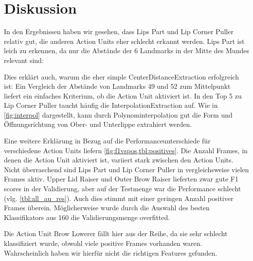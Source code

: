 \chapter{Diskussion}

In den Ergebnissen haben wir gesehen, dass Lips Part und Lip Corner Puller
relativ gut, die anderen Action Units eher schlecht erkannt werden. Lips Part
ist leich zu erkennen, da nur die Abstände der 6 Landmarks in der Mitte des
Mundes relevant sind:


Dies erklärt auch, warum die eher simple CenterDistanceExtraction erfolgreich
ist: Ein Vergleich der Abstände von Landmarks 49 und 52 zum Mittelpunkt liefert
ein einfaches Kriterium, ob die Action Unit aktiviert ist.
In den Top 5 zu Lip Corner Puller taucht häufig die InterpolationExtraction auf.
Wie in \cref{fig:interpol} dargestellt, kann durch Polynominterpolation gut die
Form und Öffnungsrichtung von Ober- und Unterlippe extrahiert werden. 

Eine weitere Erklärung in Bezug auf die Performanceunterschiede für verschiedene
Action Units liefern \cref{fig:f1vspos,tbl:positives}. Die Anzahl Frames, in
denen die Action Unit aktiviert ist, variiert stark zwischen den Action Units.
Nicht überraschend sind Lips Part und Lip Corner Puller in vergleichsweise
vielen Frames aktiv. Upper Lid Raiser und Outer Brow Raiser lieferten
zwar gute F1 scores in der Validierung, aber auf der Testmenge war die
Performance schlecht (vlg. \cref{tbl:all_au_res}). Auch dies stimmt mit einer
geringen Anzahl positiver Frames überein. Möglicherweise wurde durch die Auswahl
des besten Klassifikators aus 160 die Validierungsmenge overfitted.

Die Action Unit Brow Lowerer fällt hier aus der Reihe, da sie sehr schlecht
klassifiziert wurde, obwohl viele positive Frames vorhanden waren.
Wahrscheinlich haben wir hierfür nicht die richtigen Features gefunden.



